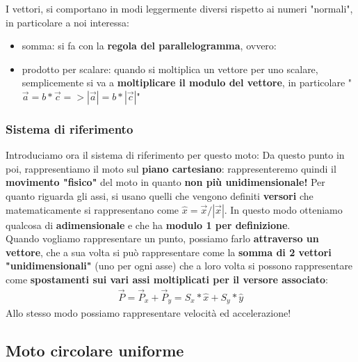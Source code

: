 				I vettori, si comportano in modi leggermente diversi rispetto ai numeri "normali", in particolare a noi interessa:
				\begin{itemize}
					\item somma: si fa con la \textbf{regola del parallelogramma}, ovvero:
					\item prodotto per scalare: quando si moltiplica un vettore per uno scalare, semplicemente si va a \textbf{moltiplicare il modulo del vettore}, in particolare "$\vec{a} = b * \vec{c} => |\vec{a}|= b * |\vec{c}|$"
				\end{itemize}

			\subsubsection{Sistema di riferimento}
				Introduciamo ora il sistema di riferimento per questo moto:
				Da questo punto in poi, rappresentiamo il moto sul \textbf{piano cartesiano}: rappresenteremo quindi il \textbf{movimento "fisico"} del moto in quanto \textbf{non più unidimensionale!} Per quanto riguarda gli assi, si usano quelli che vengono definiti \textbf{versori} che matematicamente si rappresentano come $\hat{x} = \vec{x}/|\vec{x}|$. In questo modo otteniamo qualcosa di \textbf{adimensionale} e che ha \textbf{modulo 1 per definizione}.
				\medskip\\
				Quando vogliamo rappresentare un punto, possiamo farlo \textbf{attraverso un vettore}, che a sua volta si può rappresentare come la \textbf{somma di 2 vettori "unidimensionali"} (uno per ogni asse) che a loro volta si possono rappresentare come \textbf{spostamenti sui vari assi moltiplicati per il versore associato}:
				\begin{align*}
					\vec{P} = \vec{P}_x + \vec{P}_y = S_x * \hat{x} + S_y * \hat{y}
				\end{align*}
				Allo stesso modo possiamo rappresentare velocità ed accelerazione!



			\subsection{Moto circolare uniforme}


